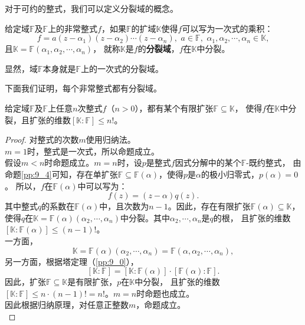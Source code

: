 \documentclass[12pt,UTF8]{ctexbook}
\begin{document}
\begin{appendix}
对于可约的整式，我们可以定义分裂域的概念。
\begin{df}\label{df:9_2}
    给定域$\mathbb{F}$及$\mathbb{F}$上的非常整式$f$，如果$\mathbb{F}$的扩域$\mathbb{K}$使得$f$可以写为一次式的乘积：
    $$ f = a(z - \alpha_1)(z - \alpha_2)\cdots(z - \alpha_n), \,\, a \in \mathbb{F}, \,\, \alpha_1, \alpha_2, \cdots ,  \alpha_n \in \mathbb{K}, $$
    且$\mathbb{K} = \mathbb{F}(\alpha_1, \alpha_2, \cdots , \alpha_n)$，
    就称$\mathbb{K}$是$f$的\textbf{分裂域}，$f$在$\mathbb{K}$中分裂。
\end{df}

显然，域$\mathbb{F}$本身就是$\mathbb{F}$上的一次式的分裂域。

下面我们证明，每个非常整式都有分裂域。
\begin{tm}\label{tm:9_5}
    给定域$\mathbb{F}$及$\mathbb{F}$上任意$n$次整式$f$（$n > 0$），都有某个有限扩张$\mathbb{F} \subseteq \mathbb{K}$，
    使得$f$在$\mathbb{K}$中分裂，且扩张的维数$[\mathbb{K} : \mathbb{F}] \leqslant n!$。
\end{tm}
\begin{proof} %
    对整式的次数$m$使用归纳法。\\
    $m = 1$时，整式是一次式，所以命题成立。\\
    假设$m < n$时命题成立。$m = n$时，设$p$是整式$f$因式分解中的某个$\mathbb{F}$-既约整式，
    由命题\ref{pp:9_4}可知，存在单扩张$\mathbb{F} \subseteq \mathbb{F}(\alpha)$，使得$p$是$\alpha$的极小归零式，$p(\alpha) = 0$。
    所以，$f$在$\mathbb{F}(\alpha)$中可以写为：
    $$ f(z) = (z - \alpha) q(z).$$
    其中整式$q$的系数在$\mathbb{F}(\alpha)$中，且次数为$n-1$。因此，存在有限扩张$\mathbb{F}(\alpha) \subseteq \mathbb{K}$，
    使得$q$在$\mathbb{K} = \mathbb{F}(\alpha)(\alpha_2, \cdots , \alpha_n)$中分裂。其中$\alpha_2, \cdots , \alpha_n$是$q$的根，
    且扩张的维数$[\mathbb{K} : \mathbb{F}(\alpha)] \leqslant (n - 1)!$。\\
    一方面，
    $$\mathbb{K} = \mathbb{F}(\alpha)(\alpha_2, \cdots , \alpha_n) = \mathbb{F}(\alpha, \alpha_2, \cdots , \alpha_n),$$
    另一方面，根据塔定理（\ref{pp:9_0}），
    $$[\mathbb{K} : \mathbb{F}] = [\mathbb{K} : \mathbb{F}(\alpha)]\cdot [\mathbb{F}(\alpha) : \mathbb{F}]. $$
    因此，扩张$\mathbb{F} \subseteq \mathbb{K}$是有限扩张，$p$在$\mathbb{K}$中分裂，
    且扩张的维数$[\mathbb{K} : \mathbb{F}] \leqslant n \cdot (n - 1)! = n!$。$m = n$时命题也成立。\\
    因此根据归纳原理，对任意正整数$m$，命题成立。\\
\end{proof}


\end{appendix}
\end{document}
